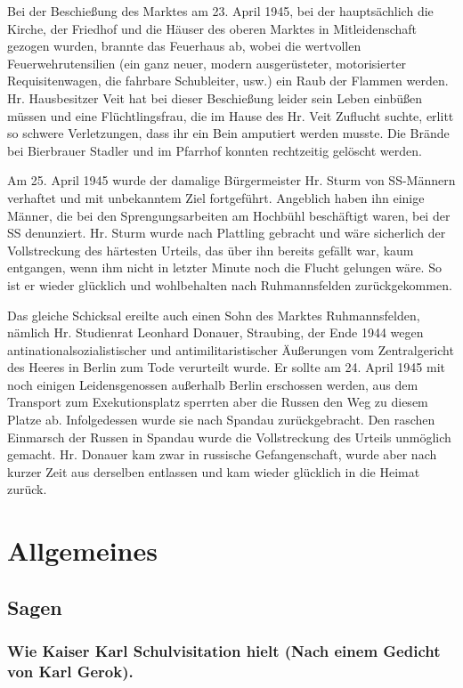 \documentclass[12pt,a4paper]{book}
\begin{document}
Bei der Beschießung des Marktes am 23. April 1945, bei der hauptsächlich die
Kirche, der Friedhof und die Häuser des oberen Marktes in Mitleidenschaft
gezogen wurden, brannte das Feuerhaus ab, wobei die wertvollen
Feuerwehrutensilien (ein ganz neuer, modern ausgerüsteter, motorisierter
Requisitenwagen, die fahrbare Schubleiter, usw.) ein Raub der Flammen werden.
Hr. Hausbesitzer Veit hat bei dieser Beschießung leider sein Leben einbüßen
müssen und eine Flüchtlingsfrau, die im Hause des Hr. Veit Zuflucht suchte,
erlitt so schwere Verletzungen, dass ihr ein Bein amputiert werden musste. Die
Brände bei Bierbrauer Stadler und im Pfarrhof konnten rechtzeitig gelöscht
werden.

Am 25. April 1945 wurde der damalige Bürgermeister Hr. Sturm von SS-Männern
verhaftet und mit unbekanntem Ziel fortgeführt. Angeblich haben ihn einige
Männer, die bei den Sprengungsarbeiten am Hochbühl beschäftigt waren, bei der SS
denunziert. Hr. Sturm wurde nach Plattling gebracht und wäre sicherlich der
Vollstreckung des härtesten Urteils, das über ihn bereits gefällt war, kaum
entgangen, wenn ihm nicht in letzter Minute noch die Flucht gelungen wäre. So
ist er wieder glücklich und wohlbehalten nach Ruhmannsfelden zurückgekommen.

Das gleiche Schicksal ereilte auch einen Sohn des Marktes Ruhmannsfelden,
nämlich Hr. Studienrat Leonhard Donauer, Straubing, der Ende 1944 wegen
antinationalsozialistischer und antimilitaristischer Äußerungen vom
Zentralgericht des Heeres in Berlin zum Tode verurteilt wurde. Er sollte am 24.
April 1945 mit noch einigen Leidensgenossen außerhalb Berlin erschossen werden,
aus dem Transport zum Exekutionsplatz sperrten aber die Russen den Weg zu diesem
Platze ab. Infolgedessen wurde sie nach Spandau zurückgebracht. Den raschen
Einmarsch der Russen in Spandau wurde die Vollstreckung des Urteils unmöglich
gemacht. Hr. Donauer kam zwar in russische Gefangenschaft, wurde aber nach
kurzer Zeit aus derselben entlassen und kam wieder glücklich in die Heimat
zurück.

\part{Allgemeines}

\chapter{Sagen}

\section{Wie Kaiser Karl Schulvisitation hielt (Nach einem Gedicht von Karl
Gerok).}
\end{document}
